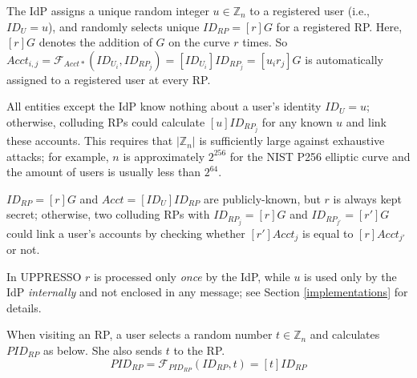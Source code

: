 The IdP assigns a unique random integer $u \in \mathbb{Z}_n$ to a registered user (i.e., $ID_U = u$),
  and randomly selects unique $ID_{RP} = [r]G$ for a registered RP. %
Here, %
 $[r]G$ denotes the addition of $G$ on the curve $r$ times.
So $Acct_{i,j} = \mathcal{F}_{Acct\ast}(ID_{U_i}, ID_{RP_j})= [ID_{U_i}]ID_{RP_j} =[u_ir_j]G$ is automatically assigned to a registered user at every RP.

All entities except the IdP
    know nothing about a user's identity $ID_U = u$; otherwise, colluding RPs could calculate $[u]ID_{RP_j}$ for any known $u$ and link these accounts.
This requires that $|\mathbb{Z}_n|$ is sufficiently large against exhaustive attacks; for example, $n$ is approximately $2^{256}$ for the NIST P256 elliptic curve and the amount of users is usually less than $2^{64}$.

$ID_{RP} = [r]G$ and $Acct = [ID_U]ID_{RP}$ are publicly-known,
 but $r$ is always kept secret;
otherwise, two colluding RPs with $ID_{RP_j} = [r]G$ and $ID_{RP_{j'}} = [r']G$ could link a user's accounts by checking whether $[r']Acct_j$ is equal to $[r]Acct_{j'}$ or not.

In UPPRESSO $r$ is processed only \emph{once} by the IdP,
    while $u$ is used only by the IdP \emph{internally} and
 not enclosed in any message; see Section \ref{implementations} for details.


 When visiting an RP,
a user selects a random number $t \in \mathbb{Z}_n$
    and calculates $PID_{RP}$ as below. She also sends $t$ to the RP.
\begin{equation}
PID_{RP} = \mathcal{F}_{PID_{RP}}(ID_{RP},t) = [t]{ID_{RP}}
\label{equ:PIDRP}
\end{equation}



